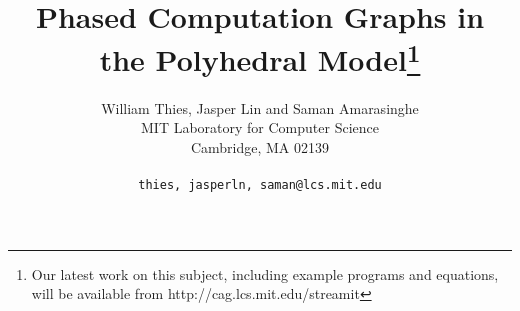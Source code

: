 \documentclass[10pt]{article}
\title{Phased Computation Graphs in the Polyhedral Model\footnote{\small Our latest work on this subject, including example programs and equations, will be available from http://cag.lcs.mit.edu/streamit}}
\author{William Thies, Jasper Lin and Saman Amarasinghe \\
  MIT Laboratory for Computer Science\\
  Cambridge, MA  02139\\ \\
  \texttt{\symbol{`\{}thies, jasperln, saman\symbol{`\}}@lcs.mit.edu}}
\date{}
\begin{document}
  \maketitle

  \newcommand{\mt}[1]{\mbox{\it #1}}
  \newcommand{\todo}[1]{\framebox{\bf #1}}
  \newcommand{\dep}[0]{Dependence Frontier}                %
  \newcommand{\DP}[0]{\textsc{Frontier}}                   %
  \newcommand{\DEP}[2]{\DP_{#1 \small{\rightarrow} #2}}    %

  \begin{abstract}
    
  \end{abstract}

  
  
  
  
  
  
  

\vspace{-18pt}
  \begin{small}
    \begin{singlespace}
      
      
    \end{singlespace}
  \end{small}

%  
  
\end{document}
